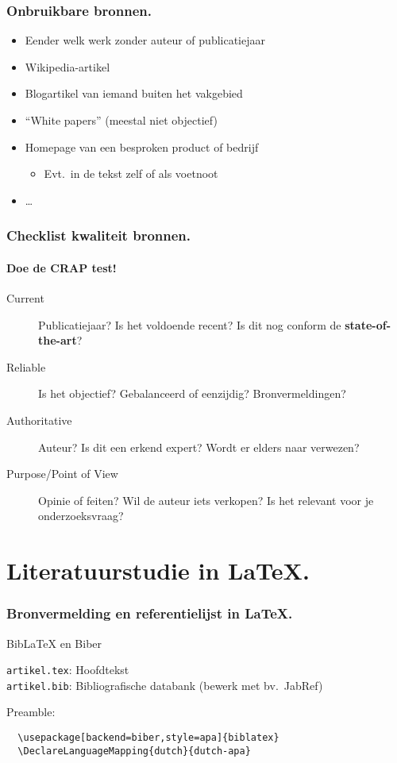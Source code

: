 \documentclass[aspectratio=169]{beamer}
\begin{document}
\begin{frame}
  \frametitle{Onbruikbare bronnen.}

  \begin{itemize}
    \item Eender welk werk zonder auteur of publicatiejaar
    \item Wikipedia-artikel
    \item Blogartikel van iemand buiten het vakgebied
    \item ``White papers'' (meestal niet objectief)
    \item Homepage van een besproken product of bedrijf
    \begin{itemize}
      \item Evt.~in de tekst zelf of als voetnoot
    \end{itemize}
    \item \dots
  \end{itemize}
\end{frame}

\begin{frame}
  \frametitle{Checklist kwaliteit bronnen.}
  \framesubtitle{Doe de CRAP test!}

  \begin{description}
    \item[Current] Publicatiejaar? Is het voldoende recent? Is dit nog conform de \textbf{state-of-the-art}?
    \item[Reliable] Is het objectief? Gebalanceerd of eenzijdig?
    Bronvermeldingen?
    \item[Authoritative] Auteur? Is dit een erkend expert? Wordt er elders naar verwezen?
    \item[Purpose/Point of View] Opinie of feiten? Wil de auteur iets verkopen? Is het relevant voor je onderzoeksvraag?
  \end{description}

\end{frame}

\section{Literatuurstudie in {\LaTeX}.}

\begin{frame}[fragile]
  \frametitle{Bronvermelding en referentielijst in {\LaTeX}.}

  Bib{\LaTeX} en Biber

  \vspace{18pt}

  \verb|artikel.tex|: Hoofdtekst\\
  \verb|artikel.bib|: Bibliografische databank (bewerk met bv.~JabRef)

  \vspace{18pt}

  Preamble:

  \begin{verbatim}
  \usepackage[backend=biber,style=apa]{biblatex}
  \DeclareLanguageMapping{dutch}{dutch-apa}
  
  \end{verbatim}

\end{frame}
\end{document}
